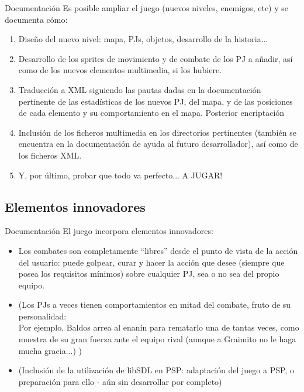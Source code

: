 \documentclass[9pt,xcolor=svgnames]{beamer}
\begin{document}
   \begin{frame}{Documentación}
    Es posible ampliar el juego (nuevos niveles, enemigos, etc) y se
    documenta cómo:

    \begin{enumerate}
     \item Diseño del nuevo nivel: mapa, PJs, objetos, desarrollo de la
	   historia...
     \item Desarrollo de los sprites de movimiento y de combate de los
	   PJ a añadir, así como de los nuevos elementos multimedia, si
	   los hubiere.
     \item Traducción a XML siguiendo las pautas dadas en la
	   documentación pertinente de las estadísticas de los nuevos
	   PJ, del mapa, y de las posiciones de cada elemento y su
	   comportamiento en el mapa. Posterior encriptación
     \item Inclusión de los ficheros multimedia en los directorios
	   pertinentes (también se encuentra en la documentación de
	   ayuda al futuro desarrollador), así como de los ficheros XML.
     \item Y, por último, probar que todo va perfecto... A JUGAR!
    \end{enumerate}
   \end{frame}

  \subsection{Elementos innovadores}

   \begin{frame}{Documentación}
    El juego incorpora elementos innovadores:
    \begin{itemize}
     \item Los combates son completamente ``libres'' desde el punto de
	   vista de la acción del usuario: puede golpear, curar y hacer
	   la acción que desee (siempre que posea los requisitos
	   mínimos) sobre cualquier PJ, sea o no sea del propio equipo.\\

     \item (Los PJs a veces tienen comportamientos en mitad del combate,
	   fruto de su personalidad:\\
	   Por ejemplo, Baldos arrea al enanín para rematarlo una de
	   tantas veces, como muestra de su gran fuerza ante el equipo
	   rival (aunque a Graimito no le haga mucha gracia...) )

     \item (Inclusión de la utilización de libSDL en PSP: adaptación del
	   juego a PSP, o preparación para ello - aún sin desarrollar
	   por completo)

    \end{itemize}
   \end{frame}
\end{document}
